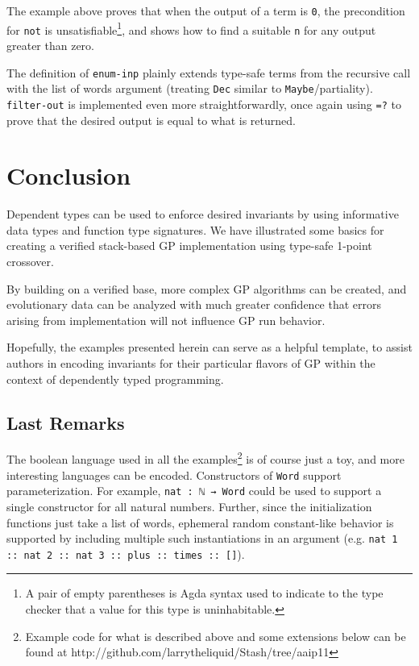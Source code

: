 \documentclass[runningheads,a4paper]{llncs}
\begin{document}
The example above proves that when the output of a term is \texttt{0},
the precondition for \texttt{not} is unsatisfiable\footnote{A pair of empty
  parentheses is Agda syntax used to indicate to the type
  checker that a value for this type is uninhabitable.}, and shows how
to find a suitable \texttt{n} for any output greater than zero.

The definition of \texttt{enum-inp} plainly extends type-safe terms
from the recursive call with the list of words argument (treating
\texttt{Dec} similar to
\texttt{Maybe}/partiality). \texttt{filter-out} is implemented even
more straightforwardly, once again using \texttt{=?} to prove that the
desired output is equal to what is returned.

\section{Conclusion}

Dependent types can be used to enforce desired invariants by using
informative data types and function type signatures. We have illustrated
some basics for creating a verified stack-based GP implementation
using type-safe 1-point crossover.

By building on a verified base, more complex GP algorithms can be
created, and evolutionary data can be analyzed with much greater
confidence that errors arising from implementation will not influence
GP run behavior.

Hopefully, the examples presented herein can serve as a helpful template,
to assist authors in encoding invariants for their particular flavors of
GP within the context of dependently typed programming.

\subsection{Last Remarks}

The boolean language used in all the examples\footnote{Example code
  for what is described above and some extensions below can
  be found at http://github.com/larrytheliquid/Stash/tree/aaip11
} is of course just a toy,
and more interesting languages can be encoded. Constructors of
\texttt{Word} support parameterization. For example, \texttt{nat : ℕ →
  Word} could be used to support a single constructor for all natural
numbers. Further, since the initialization functions just take a list
of words, ephemeral random constant-like behavior is supported by
including multiple such instantiations in an argument
(e.g. \texttt{nat 1 :: nat 2 :: nat 3 :: plus :: times :: []}). 
\end{document}
